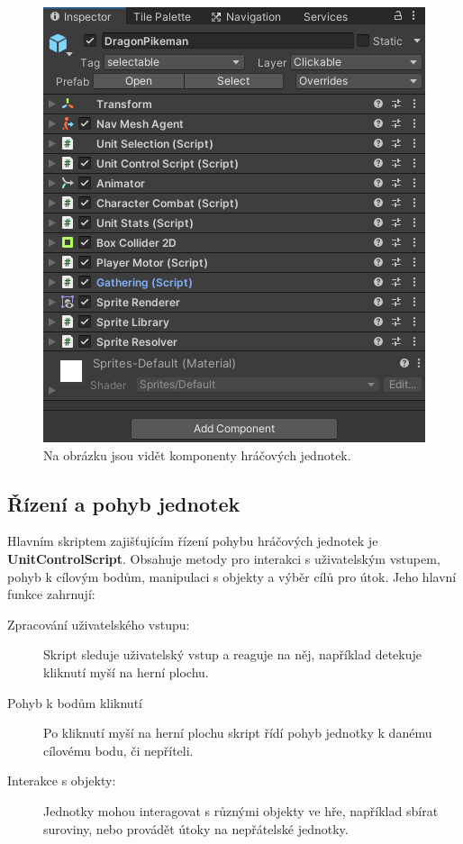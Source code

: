 \begin{figure}[H]
	\centering
	\includegraphics[scale=1]{obrazky-figures/PlayerComponents.png}
	\caption{Na obrázku jsou vidět komponenty hráčových jednotek.}
	\label{PlayerScripts}
\end{figure}

\subsection{Řízení a pohyb jednotek}
Hlavním skriptem zajišťujícím řízení pohybu hráčových jednotek je \textbf{UnitControlScript}. Obsahuje metody pro interakci s uživatelským vstupem, pohyb k cílovým bodům, manipulaci s objekty a výběr cílů pro útok. Jeho hlavní funkce zahrnují:

\begin{description}
	\item [Zpracování uživatelského vstupu:] Skript sleduje uživatelský vstup a reaguje na něj, například detekuje kliknutí myší na herní plochu.
	\item [Pohyb k bodům kliknutí] Po kliknutí myší na herní plochu skript řídí pohyb jednotky k danému cílovému bodu, či nepříteli.
	\item [Interakce s objekty:] Jednotky mohou interagovat s různými objekty ve hře, například sbírat suroviny, nebo provádět útoky na nepřátelské jednotky.
\end{description}

